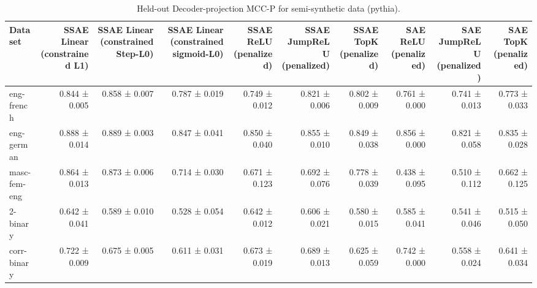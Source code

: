 \begin{table}[t]
\centering
\caption{Held-out Decoder-projection MCC-P for semi-synthetic data (pythia).}
\label{tab:semisynthetic-pythia-decoder-projection-mcc-p}
\begin{tabular}{lrrrrrrrrr}
\toprule
Dataset & SSAE Linear (constrained L1) & SSAE Linear (constrained Step-L0) & SSAE Linear (constrained sigmoid-L0) & SSAE ReLU (penalized) & SSAE JumpReLU (penalized) & SSAE TopK (penalized) & SAE ReLU (penalized) & SAE JumpReLU (penalized) & SAE TopK (penalized) \\
\midrule
eng-french & 0.844 ± 0.005 & 0.858 ± 0.007 & 0.787 ± 0.019 & 0.749 ± 0.012 & 0.821 ± 0.006 & 0.802 ± 0.009 & 0.761 ± 0.000 & 0.741 ± 0.013 & 0.773 ± 0.033 \\
eng-german & 0.888 ± 0.014 & 0.889 ± 0.003 & 0.847 ± 0.041 & 0.850 ± 0.040 & 0.855 ± 0.010 & 0.849 ± 0.038 & 0.856 ± 0.000 & 0.821 ± 0.058 & 0.835 ± 0.028 \\
masc-fem-eng & 0.864 ± 0.013 & 0.873 ± 0.006 & 0.714 ± 0.030 & 0.671 ± 0.123 & 0.692 ± 0.076 & 0.778 ± 0.039 & 0.438 ± 0.095 & 0.510 ± 0.112 & 0.662 ± 0.125 \\
2-binary & 0.642 ± 0.041 & 0.589 ± 0.010 & 0.528 ± 0.054 & 0.642 ± 0.012 & 0.606 ± 0.021 & 0.580 ± 0.015 & 0.585 ± 0.041 & 0.541 ± 0.046 & 0.515 ± 0.050 \\
corr-binary & 0.722 ± 0.009 & 0.675 ± 0.005 & 0.611 ± 0.031 & 0.673 ± 0.019 & 0.689 ± 0.013 & 0.625 ± 0.059 & 0.742 ± 0.000 & 0.558 ± 0.024 & 0.641 ± 0.034 \\
\bottomrule
\end{tabular}
\end{table}
